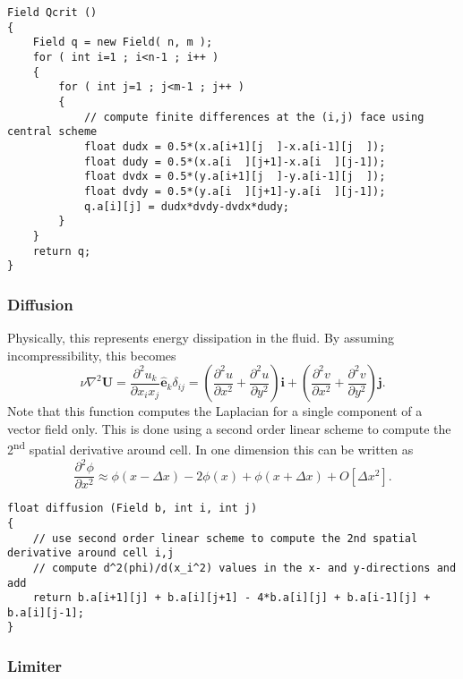 \documentclass[notitlepage]{article}
\begin{document}
\begin{lstlisting}[style=myCpp]
Field Qcrit ()
{
	Field q = new Field( n, m );
	for ( int i=1 ; i<n-1 ; i++ )
	{
		for ( int j=1 ; j<m-1 ; j++ )
		{
			// compute finite differences at the (i,j) face using central scheme
			float dudx = 0.5*(x.a[i+1][j  ]-x.a[i-1][j  ]);
			float dudy = 0.5*(x.a[i  ][j+1]-x.a[i  ][j-1]);
			float dvdx = 0.5*(y.a[i+1][j  ]-y.a[i-1][j  ]);
			float dvdy = 0.5*(y.a[i  ][j+1]-y.a[i  ][j-1]);
			q.a[i][j] = dudx*dvdy-dvdx*dudy;
		}
	}
	return q;
}
\end{lstlisting}

\subsubsection{Diffusion}

Physically, this represents energy dissipation in the fluid. By assuming incompressibility, this
becomes
%
\begin{equation}
\nu \nabla^2 \mathbf{U} = \frac{\partial^2 u_k}{\partial x_i x_j} \mathbf{\hat{e}}_k \delta_{ij} = 
	\left( \frac{\partial^2 u}{\partial x^2} + \frac{\partial^2 u}{\partial y^2} \right) \mathbf{i}
	+\left( \frac{\partial^2 v}{\partial x^2} + \frac{\partial^2 v}{\partial y^2} \right) \mathbf{j} .
\end{equation}
%
Note that this function computes the Laplacian for a single component of a vector field only.
This is done using a second order linear scheme to compute the 2\textsuperscript{nd} spatial derivative around cell.
In one dimension this can be written as
%
\begin{equation}
\frac{\partial^2 \phi}{\partial x^2} \approx \phi(x-\Delta x) -2 \phi(x) + \phi(x + \Delta x) + O[\Delta x^2] .
\end{equation}

\begin{lstlisting}[style=myCpp]
float diffusion (Field b, int i, int j)
{
	// use second order linear scheme to compute the 2nd spatial derivative around cell i,j
	// compute d^2(phi)/d(x_i^2) values in the x- and y-directions and add
	return b.a[i+1][j] + b.a[i][j+1] - 4*b.a[i][j] + b.a[i-1][j] + b.a[i][j-1];
}
\end{lstlisting}

\subsubsection{Limiter}
\end{document}
